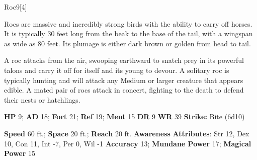   
  \begin{monsection}{Roc}{9}[4]
    \vspace{-1em}\vspace{-1em}
    \vspace{0em}

    
      Rocs are massive and incredibly strong birds with the ability to carry off horses.
      It is typically 30 feet long from the beak to the base of the tail, with a wingspan as wide as 80 feet.
      Its plumage is either dark brown or golden from head to tail.

      A roc attacks from the air, swooping earthward to snatch prey in its powerful talons and carry it off for itself and its young to devour.
      A solitary roc is typically hunting and will attack any Medium or larger creature that appears edible.
      A mated pair of rocs attack in concert, fighting to the death to defend their nests or hatchlings.
    

    \begin{spellcontent}
      \begin{spelltargetinginfo}
        \pari \textbf{HP} 9;
          \textbf{AD} 18;
          \textbf{Fort} 21;
          \textbf{Ref} 19;
          \textbf{Ment} 15
        \pari \textbf{DR} 9
        \pari \textbf{WR} 39
        \pari \textbf{Strike:}
            Bite  (6d10)
      \end{spelltargetinginfo}
    \end{spellcontent}
    \begin{monsterfooter}
      \pari \textbf{Speed} 60 ft.;
        \textbf{Space} 20 ft.;
        \textbf{Reach} 20 ft.
      \pari \textbf{Awareness} 
      \pari \textbf{Attributes}:
        Str 12, Dex 10,
        Con 11, Int -7,
        Per 0, Wil -1
      \pari \textbf{Accuracy} 13;
        \textbf{Mundane Power} 17;
      \textbf{Magical Power} 15
    \end{monsterfooter}
  \end{monsection}
  
